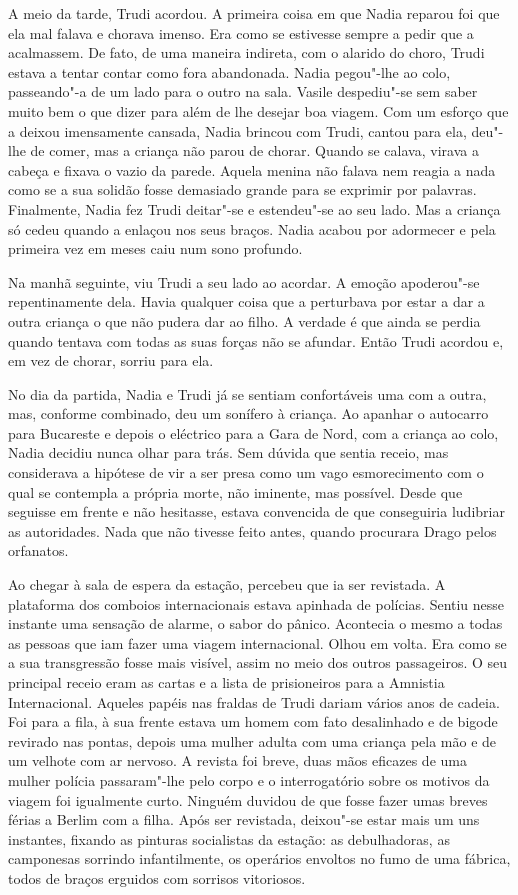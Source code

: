 A meio da tarde, Trudi acordou. A primeira coisa em
que Nadia reparou foi que ela mal falava e chorava imenso. Era como se
estivesse sempre a pedir que a acalmassem. De fato, de uma maneira
indireta, com o alarido do choro, Trudi estava a tentar contar como
fora abandonada. Nadia pegou"-lhe ao colo, passeando"-a de um lado para o
outro na sala. Vasile despediu"-se sem saber muito bem o que dizer para
além de lhe desejar boa viagem. Com um esforço que a deixou imensamente
cansada, Nadia brincou com Trudi, cantou para ela, deu"-lhe de comer, mas
a criança não parou
de chorar. Quando se calava, virava a cabeça e fixava o vazio da parede.
Aquela menina não falava nem reagia a nada como se a sua solidão fosse
demasiado grande para se exprimir por palavras. Finalmente, Nadia fez
Trudi deitar"-se e estendeu"-se ao seu lado. Mas a criança só cedeu quando
a enlaçou nos seus braços. Nadia acabou por adormecer e pela primeira
vez em meses caiu num sono profundo.

Na manhã seguinte, viu Trudi a seu lado ao acordar. A emoção apoderou"-se
repentinamente dela. Havia qualquer coisa que a perturbava por estar a
dar a outra criança o que não pudera dar ao filho. A verdade é que ainda
se perdia quando tentava com todas as suas forças não se afundar. Então
Trudi acordou e, em vez de chorar, sorriu para ela.

\bigskip

No dia da partida, Nadia e Trudi já se sentiam confortáveis uma com a
outra, mas, conforme combinado, deu um sonífero à criança. Ao apanhar o
autocarro para Bucareste e depois o eléctrico para a Gara de Nord, com
a criança ao colo, Nadia decidiu nunca olhar para trás. Sem dúvida que
sentia receio, mas considerava a hipótese de vir a ser presa como um
vago esmorecimento com o qual se contempla a própria morte, não
iminente, mas possível. Desde que seguisse em frente e não hesitasse,
estava convencida de que conseguiria ludibriar as autoridades. Nada
que não tivesse feito antes, quando procurara Drago pelos orfanatos.

Ao chegar à sala de espera da estação, percebeu que ia ser revistada. A
plataforma dos comboios internacionais
estava apinhada de polícias. Sentiu nesse instante uma sensação de
alarme, o sabor do pânico. Acontecia o mesmo a todas as pessoas que iam
fazer uma viagem internacional. Olhou em volta. Era como se a sua
transgressão fosse mais visível, assim no meio dos outros passageiros. O
seu principal receio eram as cartas e a lista de prisioneiros para a
Amnistia Internacional. Aqueles papéis nas fraldas de Trudi dariam
vários anos de cadeia. Foi para a fila, à sua frente estava um homem com
fato desalinhado e de bigode revirado nas pontas, depois uma mulher
adulta com uma criança pela mão e de um velhote com ar nervoso. A
revista foi breve, duas mãos eficazes de uma mulher polícia passaram"-lhe
pelo corpo e o interrogatório sobre os motivos da viagem foi
igualmente curto. Ninguém duvidou de que fosse fazer umas breves férias
a Berlim com a filha. Após ser revistada, deixou"-se estar mais um uns
instantes, fixando as pinturas socialistas da estação: as debulhadoras, as camponesas sorrindo infantilmente, os operários envoltos no fumo
de uma fábrica, todos de braços erguidos com sorrisos vitoriosos.

